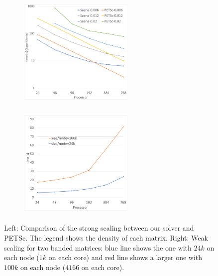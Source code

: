 \begin{figure}[tbh]
    \centering
    \begin{subfigure}{.45\textwidth}
        \centering
        \includegraphics[width=5.5cm,height=5.4cm]{./figures/strong_size_vs_petsc.pdf}
    \end{subfigure}
    \begin{subfigure}{.45\textwidth}
        \centering
        \includegraphics[width=5.5cm,height=5.4cm]{./figures/weak1.pdf}
    \end{subfigure}
    \caption{Left: Comparison of the strong scaling between our solver and PETSc. The legend shows the density of each matrix. Right: Weak scaling for two banded matrices: blue line shows the one with $24k$ on each node ($1k$ on each core) and red line shows a larger one with $100k$ on each node ($4166$ on each core).}
    \label{fig:petsc1}
\end{figure}


